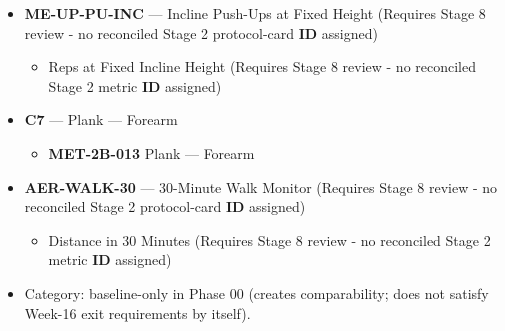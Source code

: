 \documentclass[10pt]{article}
\begin{document}
\begin{itemize}
\begin{itemize}
    \begin{itemize}
    \item Reps in 30 Seconds (Requires Stage 8 review - no reconciled Stage 2 metric \textbf{ID} assigned)
    \end{itemize}
  \item \textbf{ME-UP-PU-INC} — Incline Push-Ups at Fixed Height (Requires Stage 8 review - no reconciled Stage 2 protocol-card \textbf{ID} assigned)
    \begin{itemize}
    \item Reps at Fixed Incline Height (Requires Stage 8 review - no reconciled Stage 2 metric \textbf{ID} assigned)
    \end{itemize}
  \item \textbf{C7} — Plank — Forearm
    \begin{itemize}
    \item \textbf{MET-2B-013} Plank — Forearm
    \end{itemize}
  \item \textbf{AER-WALK-30} — 30-Minute Walk Monitor (Requires Stage 8 review - no reconciled Stage 2 protocol-card \textbf{ID} assigned)
    \begin{itemize}
    \item Distance in 30 Minutes (Requires Stage 8 review - no reconciled Stage 2 metric \textbf{ID} assigned)
    \end{itemize}
  \item Category: baseline-only in Phase 00 (creates comparability; does not satisfy Week-16 exit requirements by itself).
  \end{itemize}


\end{itemize}
\end{document}
